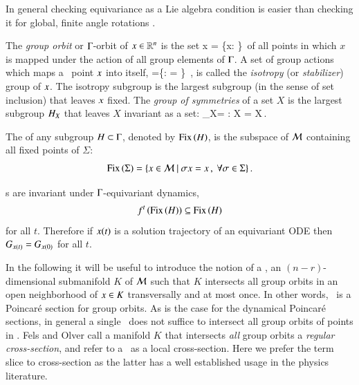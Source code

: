 In general checking equivariance as a Lie algebra condition
 is easier than checking it for global,
finite angle rotations .

The \emph{group orbit} or $\Gamma$-orbit of
$x\in\mathbb{R}^{n}$ is the set
\beq
	\Group x = \{\Glmn x: \Glmn\in\Group\}\,
\eeq
of all points in which $x$ is mapped under the action of all
group elements of $\Gamma$.
A set of group actions which maps a \statesp\ point $x$ into itself,
\beq
\stab{\ssp} =\{\Glmn \in \Group: \Glmn \ssp = \ssp \}
    \,,
is called the \emph{isotropy} (or \emph{stabilizer})  group of $\ssp$.
The isotropy subgroup is the largest subgroup (in the
sense of set inclusion) that leaves $\ssp$ fixed.
The \emph{group of symmetries} of a set $X$ is the largest
subgroup $\Subgroup_X$ that leaves $X$ invariant as a set:
\beq
	\Group_X= {\Glmn: \Glmn X = X}\,.
\eeq

The \emph{\fixedsp} of any subgroup $H\subset\Gamma$,
denoted by $\mathrm{Fix}\left(H\right)$, is the subspace of $\mathcal{M}$ containing all fixed points of $\Sigma$:
\[
	\mathrm{Fix}\left(\Sigma\right)=\{x\in\mathcal{M}\ |\ \sigma x = x\,,\ \forall \sigma\in\Sigma\}\,.
\]

\Fixedsp s are invariant under $\Gamma$-equivariant dynamics,
\[
 f^t\left(\mathrm{Fix}\left(H\right)\right)\subseteq \mathrm{Fix}\left(H\right)
\] for all
$t$. Therefore if $x(t)$ is a solution trajectory of an
equivariant ODE then $G_{x(t)}=G_{x(0)}$ for all $t$.

In the following it will be useful to introduce the
notion of a \emph{\slice}, an $(n-r)$-dimensional submanifold $K$
of $\mathcal{M}$ such that $K$ intersects all group orbits in an
open neighborhood of $x \in K$
transversally and at most once.
In other words, \slice\ is a Poincar\'e section for group
orbits. As is the case for the dynamical Poincar\'e sections,
in general a single \slice\ does not suffice to intersect all
group orbits of points in \pS. Fels and Olver
call a manifold $K$ that intersects \emph{all} group orbits a
\emph{regular cross-section}, and refer to a \slice\ as a local
cross-section. Here we prefer the term slice
to cross-section as the latter has a well established usage in the physics
literature.  


